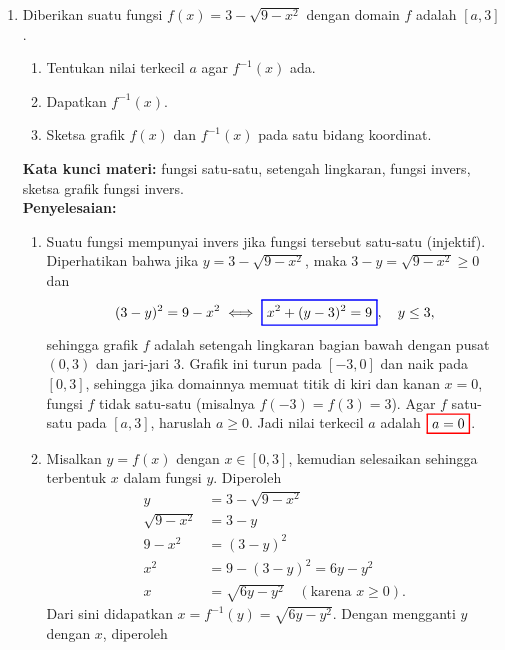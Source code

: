 \documentclass[10pt,openany,a4paper]{article}
\theoremstyle{definition}
\theoremstyle{definition}
\theoremstyle{plain}
\newenvironment{jawab}[2][tes]{%
\par\noindent\textbf{Kata kunci materi:} #1.\\
\textbf{Penyelesaian:} #2%
}{}
\begin{document}
\begin{enumerate}
    \item Diberikan suatu fungsi $f(x)=3-\sqrt{9-x^2}$ dengan domain $f$ adalah $[a,3]$.
    \begin{enumerate}
        \item Tentukan nilai terkecil $a$ agar $f^{-1}(x)$ ada.
        \item Dapatkan $f^{-1}(x)$.
        \item Sketsa grafik $f(x)$ dan $f^{-1}(x)$ pada satu bidang koordinat.
    \end{enumerate}
    \begin{jawab}[fungsi satu-satu, setengah lingkaran, fungsi invers, sketsa grafik fungsi invers]{
        \begin{enumerate}
            \item Suatu fungsi mempunyai invers jika fungsi tersebut satu-satu (injektif). Diperhatikan bahwa jika $y=3-\sqrt{9-x^2}$, maka $3-y=\sqrt{9-x^2}\geq 0$ dan
            \begin{align*}
                (3-y)^2 = 9-x^2 \iff \colorlet{oldcolor}{.}
        \color{blue}
        \setlength{\fboxrule}{1pt} \boxed{\color{oldcolor}x^2+(y-3)^2=9}\color{oldcolor},\quad y\leq 3,
            \end{align*}
            sehingga grafik $f$ adalah setengah lingkaran bagian bawah dengan pusat $(0,3)$ dan jari-jari $3$. Grafik ini turun pada $[-3,0]$ dan naik pada $[0,3]$, sehingga jika domainnya memuat titik di kiri dan kanan $x=0$, fungsi $f$ tidak satu-satu (misalnya $f(-3)=f(3)=3$). Agar $f$ satu-satu pada $[a,3]$, haruslah $a\geq 0$. Jadi nilai terkecil $a$ adalah $\colorlet{oldcolor}{.}
        \color{red}
        \setlength{\fboxrule}{1pt} \boxed{\color{oldcolor}a=0}\color{oldcolor}$.
            \item Misalkan $y=f(x)$ dengan $x\in[0,3]$, kemudian selesaikan sehingga terbentuk $x$ dalam fungsi $y$. Diperoleh
            \begin{align*}
                y &= 3-\sqrt{9-x^2}\\
                \sqrt{9-x^2} &= 3-y\\
                9-x^2 &= (3-y)^2\\
                x^2 &= 9-(3-y)^2 = 6y-y^2\\
                x &= \sqrt{6y-y^2} \quad (\text{karena } x\geq 0).
            \end{align*}
            Dari sini didapatkan $x = f^{-1}(y) = \sqrt{6y-y^2}$. Dengan mengganti $y$ dengan $x$, diperoleh
            \begin{align*}

\end{align*}
\end{enumerate}}
\end{jawab}
\end{enumerate}
\end{document}
